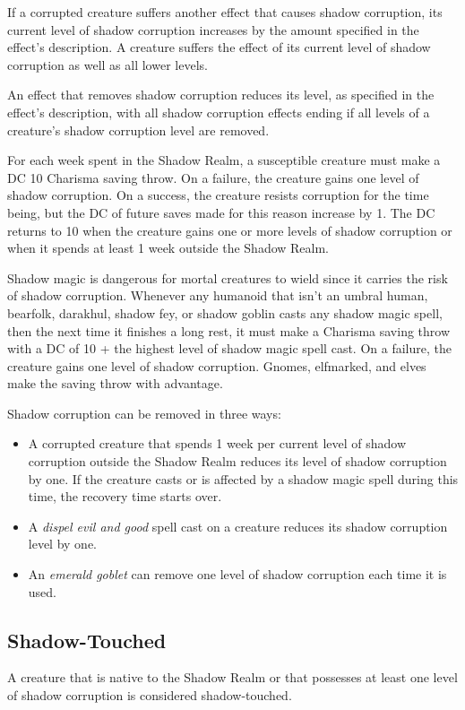\documentclass[10pt,a4paper,twoside,bg=print,twocolumn,openany,nodeprecatedcode]{dndbook}
\begin{document}
If a corrupted creature suffers another effect that causes shadow corruption, its current level of shadow corruption increases by the amount specified in the effect's description. A creature suffers the effect of its current level of shadow corruption as well as all lower levels.

An effect that removes shadow corruption reduces its level, as specified in the effect's description, with all shadow corruption effects ending if all levels of a creature's shadow corruption level are removed.

For each week spent in the Shadow Realm, a susceptible creature must make a DC 10 Charisma saving throw. On a failure, the creature gains one level of shadow corruption. On a success, the creature resists corruption for the time being, but the DC of future saves made for this reason increase by 1. The DC returns to 10 when the creature gains one or more levels of shadow corruption or when it spends at least 1 week outside the Shadow Realm.

Shadow magic is dangerous for mortal creatures to wield since it carries the risk of shadow corruption. Whenever any humanoid that isn't an umbral human, bearfolk, darakhul, shadow fey, or shadow goblin casts any shadow magic spell, then the next time it finishes a long rest, it must make a Charisma saving throw with a DC of 10 + the highest level of shadow magic spell cast. On a failure, the creature gains one level of shadow corruption. Gnomes, elfmarked, and elves make the saving throw with advantage.

Shadow corruption can be removed in three ways:


\begin{itemize}
\item A corrupted creature that spends 1 week per current level of shadow corruption outside the Shadow Realm reduces its level of shadow corruption by one. If the creature casts or is affected by a shadow magic spell during this time, the recovery time starts over.
\item A \textit{dispel evil and good} spell cast on a creature reduces its shadow corruption level by one.
\item An \textit{emerald goblet} can remove one level of shadow corruption each time it is used.
\end{itemize}

\subsection{Shadow-Touched}
A creature that is native to the Shadow Realm or that possesses at least one level of shadow corruption is considered shadow-touched.
\end{document}
